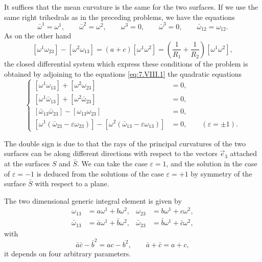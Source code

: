 \documentclass[leqno,11pt]{book}
\numberwithin{equation}{chapter}
\theoremstyle{shape1}
\theoremstyle{shape0}
\theoremstyle{shape2}
\theoremstyle{definition}
\begin{document}
\fsec It suffices that the mean curvature is the same for the two surfaces. If we use the same right trihedrals as in the preceding problems, we have the equations
\begin{equation}
  \label{eq:7.VIII.1}\tag{VIII, 1}
  \bar\omega^{1}=\omega^{1},\qquad\bar\omega^{2}=\omega^{2},\qquad\omega^{3}=0,\qquad\bar\omega^{3}=0,\qquad\bar\omega_{12}=\omega_{12}.
\end{equation}
As on the other hand
\[
[\omega^{1}\omega_{23}]-[\omega^{2}\omega_{13}]=(a+c)[\omega^{1}\omega^{2}]=\left(\frac{1}{R_{1}}+\frac{1}{R_{2}}\right)[\omega^{1}\omega^{2}],
\]
the closed differential system which express these conditions of the problem is obtained by adjoining to the equations \eqref{eq:7.VIII.1} the quadratic equations
\begin{equation}
  \label{eq:7.VIII.2}\tag{VIII, 2}
  \left\{
    \begin{aligned}{}
      [\omega^{1}\omega_{13}]+[\omega^{2}\omega_{23}]&=0,\\
      [\omega^{1}\bar\omega_{13}]+[\omega^{2}\bar\omega_{23}]&=0,\\
      [\bar\omega_{13}\bar\omega_{23}]-[\omega_{13}\omega_{23}]&=0,\\
      [\omega^{1}(\bar\omega_{23}-\varepsilon\omega_{23})]-[\omega^{2}(\bar\omega_{13}-\varepsilon\omega_{13})]&=0,\qquad(\varepsilon=\pm 1).
    \end{aligned}
  \right.
\end{equation}

The double sign is due to that the rays of the principal curvatures of the two surfaces can be along different directions with respect to the vectors $\vec e_{3}$ attached at the surfaces $S$ and $\bar S$. We can take the case $\varepsilon=1$, and the solution in the case of $\varepsilon=-1$ is deduced from the solutions of the case $\varepsilon=+1$ by symmetry of the surface $\bar S$ with respect to a plane.

The two dimensional generic integral element is given by
\begin{align*}
  \omega_{13}&=a\omega^{1}+b\omega^{2},&\omega_{23}&=b\omega^{1}+c\omega^{2},\\
  \bar\omega_{13}&=\bar a\omega^{1}+\bar b\omega^{2},&\bar\omega_{23}&=\bar b\omega^{1}+\bar c\omega^{2},
\end{align*}
with
\[
\bar a\bar c-\bar b^{2}=ac-b^{2},\qquad \bar a+\bar c=a+c,
\]
it depends on four arbitrary parameters.
\end{document}
